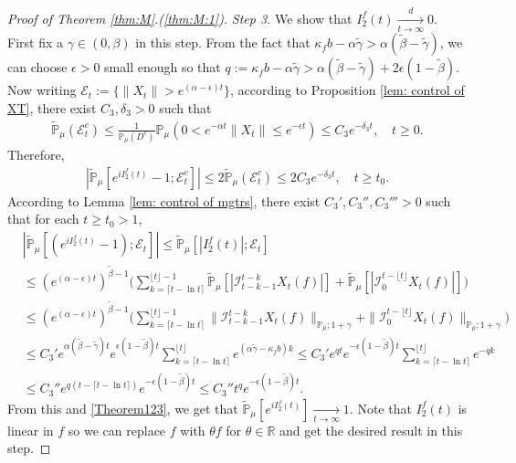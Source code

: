 \documentclass[12pt,a4paper]{amsart}
\theoremstyle{plain}
\theoremstyle{definition}
\numberwithin{equation}{section}
\begin{document}
\begin{proof}[Proof of Theorem \ref{thm:M}.(\ref{thm:M:1})]
  \emph{Step 3.}
  We show that $I^f_2(t)\xrightarrow[t\to \infty]{d} 0$.
  First fix a $\gamma \in (0,\beta)$ in this step.
  From the fact that $\kappa_f b -\alpha \tilde \gamma > \alpha (\tilde \beta - \tilde \gamma)$, we can choose $\epsilon >0$ small enough so that $q:=\kappa_fb- \alpha \tilde \gamma  > \alpha (\tilde \beta - \tilde \gamma) + 2\epsilon (1 - \tilde \beta)$.
  Now writing $\mathcal{E}_t:=\{\|X_t\|>e^{(\alpha-\epsilon) t}\}$, according to Proposition \ref{lem: control of XT}, there exist $C_3, \delta_3>0$ such that
  \begin{align}
    \mathbb{\widetilde{P}}_{\mu}(\mathcal{E}^c_t)
    \leq \frac{1}{\mathbb{P}_{\mu}(D^c)}\mathbb{P}_{\mu}(0<e^{-\alpha t}\|X_t\|\leq e^{-\epsilon t})\leq C_3e^{-\delta_3 t}
    , \quad t\geq0.
  \end{align}
  Therefore,
  \begin{align}
    \label{Theorem123}
    |\mathbb{\widetilde{P}}_{\mu}[e^{i I^f_2(t)}-1;\mathcal{E}^c_t]|
    \leq 2\mathbb{\widetilde{P}}_{\mu}(\mathcal{E}^c_t)
    \leq 2C_3e^{-\delta_3 t},
    \quad t\geq t_0.
  \end{align}
	According to Lemma \ref{lem: control of mgtrs}, there exist $C_3',C_3'',C_3'''>0$ such that for each $t\geq t_0 >1$,
  \begin{align}
    & |\mathbb{\widetilde{P}}_{\mu} [ (e^{i I^f_2(t)}-1);\mathcal{E}_t]|
      \leq  \mathbb{\widetilde{P}}_{\mu} [ |I^f_2(t)|;\mathcal{E}_t] \\
    & \leq  ( e^{(\alpha-\epsilon) t} )^{\tilde \beta - 1}\Big(\sum_{k=\lceil t-\ln t \rceil}^{\lfloor t \rfloor - 1}\mathbb{\widetilde{P}}_{\mu} [| \mathcal{I}_{t-k-1}^{t-k} X_t(f) |] + \mathbb{\widetilde{P}}_{\mu}[| \mathcal{I}_{0}^{t-\lfloor t\rfloor} X_t(f)|]\Big) \\
    & \leq ( e^{(\alpha-\epsilon) t} )^{\tilde \beta - 1}\Big(\sum_{k=\lceil t-\ln t \rceil}^{\lfloor t \rfloor - 1}\|\mathcal{I}_{t-k-1}^{t-k} X_t(f) \|_{\mathbb P_\mu; 1+\gamma} + \|\mathcal I_0^{t-\lfloor t \rfloor} X_t(f)\|_{\mathbb P_\mu;1+\gamma}\Big) \\
    & \leq C_3' e^{\alpha (\tilde \beta - \tilde \gamma)t} e ^{\epsilon (1-\tilde \beta) t}\sum_{k=\lceil t-\ln t \rceil}^{\lfloor t \rfloor}  e^{(\alpha\tilde \gamma-\kappa_f b)k}
      \leq C_3' e^{q t}e^{-\epsilon ( 1 - \tilde \beta)t}\sum_{k=\lceil t-\ln t \rceil}^{\lfloor t \rfloor}  e^{-q k}
    \\ & \leq C_3'' e^{q(t - \lceil t - \ln t\rceil)}e^{-\epsilon(1 - \tilde \beta) t}
         \leq C_3'' t^q e^{- \epsilon(1 - \tilde \beta) t}.
  \end{align}
  From this and \eqref{Theorem123}, we get that $\widetilde {\mathbb P}_\mu[e^{i I^f_2(t)}] \xrightarrow[t\to \infty]{} 1$.
  Note that $I^f_2(t)$ is linear in $f$ so we can replace $f$ with $\theta f$ for $\theta \in \mathbb R$ and get the desired result in this step.


\end{proof}
\end{document}
